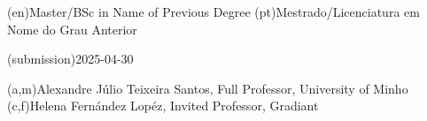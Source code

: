 \ntauthordegree(en){Master/BSc in Name of Previous Degree}
\ntauthordegree(pt){Mestrado/Licenciatura em Nome do Grau Anterior}



\ntdate(submission){2025-04-30}



(a,m){Alexandre Júlio Teixeira Santos, Full Professor, University of Minho}
(c,f){Helena Fernández Lopéz, Invited Professor, Gradiant}



